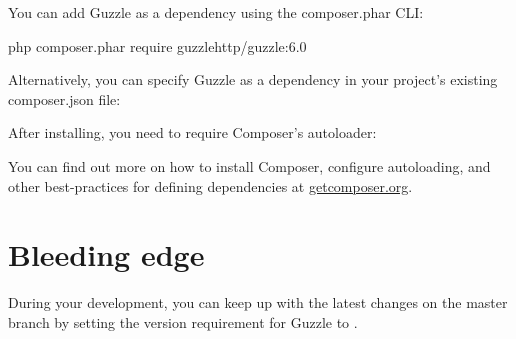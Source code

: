 \documentclass[a4paper,11pt,spanish]{sphinxmanual}
\begin{document}
You can add Guzzle as a dependency using the composer.phar CLI:

\begin{sphinxVerbatim}[commandchars=\\\{\}]
php composer.phar require guzzlehttp/guzzle:\PYGZti{}6.0
\end{sphinxVerbatim}

Alternatively, you can specify Guzzle as a dependency in your project's
existing composer.json file:

\begin{sphinxVerbatim}[commandchars=\\\{\}]
    
       
\end{sphinxVerbatim}

After installing, you need to require Composer's autoloader:

\begin{sphinxVerbatim}[commandchars=\\\{\}]
 
\end{sphinxVerbatim}

You can find out more on how to install Composer, configure autoloading, and
other best-practices for defining dependencies at \href{http://getcomposer.org}{getcomposer.org}.


\section{Bleeding edge}
\label{\detokenize{overview:bleeding-edge}}
During your development, you can keep up with the latest changes on the master
branch by setting the version requirement for Guzzle to .

\begin{sphinxVerbatim}[commandchars=\\\{\}]
    
       
\end{sphinxVerbatim}
\end{document}
